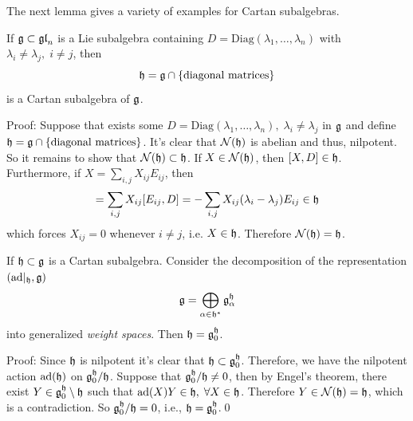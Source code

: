 The next lemma gives a variety of examples for Cartan subalgebras.
\begin{dang}
    \begin{lemma}\label{Lemma: Criteria to find Cartan subalgebras}
        If $\mathfrak{g}\subset\mathfrak{gl}_n$ is a Lie subalgebra containing $D=\text{Diag}(\lambda_1,\dots,\lambda_n)$ with 
        $\lambda_i\neq\lambda_j,\;i\neq j$, then 
        \begin{equation}
            \mathfrak{h}=\mathfrak{g}\cap\{\text{diagonal matrices}\}
        \end{equation}
        is a Cartan subalgebra of $\mathfrak{g}$.
    \end{lemma}
\end{dang}
Proof: Suppose that exists some $D=\text{Diag}(\lambda_1,\dots,\lambda_n),\;\lambda_i\neq\lambda_j$ in $\mathfrak{g}$ and 
define $\mathfrak{h}=\mathfrak{g}\cap\{\text{diagonal matrices}\}$. It's clear that $\mathcal{N}(\mathfrak{h})$ is abelian and thus, nilpotent. 
So it remains to show that $\mathcal{N}(\mathfrak{h})\subset\mathfrak{h}$. If $X\in\mathcal{N}(\mathfrak{h})$, then $[X,D]\in\mathfrak{h}$. Furthermore, if 
$X=\sum_{i,j}X_{ij}E_{ij}$, then
\begin{equation}
    [X,D]=\sum_{i,j}X_{ij}[E_{ij},D]=-\sum_{i,j}X_{ij}(\lambda_i-\lambda_j)E_{ij}\in\fr{h}
\end{equation}
which forces $X_{ij}=0$ whenever $i\neq j$, i.e. $X\in\mathfrak{h}$. Therefore $\mathcal{N}(\mathfrak{h})=\mathfrak{h}$.\par 

\begin{dang}
    \begin{lemma}
        If $\mathfrak{h}\subset\mathfrak{g}$ is a Cartan subalgebra. Consider the decomposition 
        of the representation $(\text{ad}|_{\mathfrak{h}},\mathfrak{g})$ 
        \begin{equation}
            \mathfrak{g}=\bigoplus_{\alpha\in\mathfrak{h}^*}\mathfrak{g}_\alpha^{\mathfrak{h}}
        \end{equation}
        into generalized \textit{weight spaces}. Then $\mathfrak{h}=\mathfrak{g}_0^{\mathfrak{h}}$.
    \end{lemma}
\end{dang}
Proof: Since $\mathfrak{h}$ is nilpotent it's clear that $\mathfrak{h}\subset\mathfrak{g}_0^{\mathfrak{h}}$. Therefore, we have the nilpotent action 
$\text{ad}(\mathfrak{h})$ on $\mathfrak{g}_0^{\mathfrak{h}}/\mathfrak{h}$. Suppose that $\mathfrak{g}_0^{\mathfrak{h}}/\mathfrak{h}\neq0$, then 
by Engel's theorem, there exist $Y\in\mathfrak{g}_0^{\mathfrak{h}}\setminus\mathfrak{h}$ such that 
$\text{ad}(X)Y\in\mathfrak{h},\;\forall X\in\mathfrak{h}$. Therefore $Y\in\mathcal{N}(\mathfrak{h})=\mathfrak{h}$, which is a contradiction. 
So $\mathfrak{g}_0^{\mathfrak{h}}/\mathfrak{h}=0$, i.e., $\mathfrak{h}=\mathfrak{g}_0^{\mathfrak{h}}$.\qed


